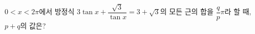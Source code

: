 $0<x<2\pi$에서 방정식 $3\tan x+\dfrac{\sqrt{3}}{\tan x}=3+\sqrt{3}$의 모든 근의 합을 $\dfrac{q}{p}\pi$라 할 때, $p+q$의 값은? 
